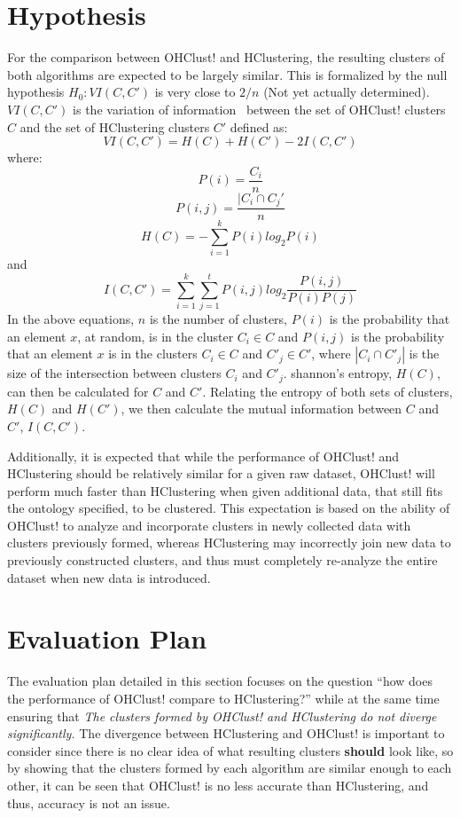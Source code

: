 \documentclass[12pt]{ucthesis}
\begin{document}
   \section{Hypothesis}\label{sec:eval_goals}
      For the comparison between \textsf{OHClust!} and HClustering, the resulting
      clusters of both algorithms are expected to be largely similar. This is
      formalized by the null hypothesis $H_0: VI(C, C')$ is very close to $2/n$
      (Not yet actually determined). $VI(C, C')$ is the variation of
      information~\cite{Halkidi:Validation} between the set of \textsf{OHClust!}
      clusters $C$ and the set of HClustering clusters $C'$ defined as:
      $$VI(C, C') = H(C) + H(C') - 2I(C, C')$$
      where:
      $$P(i) = \frac{C_i}{n}$$
      $$P(i,j) = \frac{| C_i \cap C_j'}{n}$$
      $$H(C) = -\sum_{i=1}^{k}P(i)log_2P(i)$$
      and
      $$I(C, C') = \sum_{i=1}^{k}\sum_{j=1}^{t}P(i,j)log_2\frac{P(i,j)}{P(i)P(j)}$$
      In the above equations, $n$ is the number of clusters, $P(i)$ is the
      probability that an element $x$, at random, is in the cluster $C_i \in C$
      and $P(i, j)$ is the probability that an element $x$ is in the clusters
      $C_i \in C$ and $C'_j \in C'$, where $|C_i \cap C'_j|$ is the size of the
      intersection between clusters $C_i$ and $C'_j$. shannon's entropy,
      $H(C)$, can then be calculated for $C$ and $C'$. Relating the entropy of
      both sets of clusters, $H(C)$ and $H(C')$, we then calculate the mutual
      information between $C$ and $C'$, $I(C, C')$.

      Additionally, it is expected that while the performance of \textsf{OHClust!} and
      HClustering should be relatively similar for a given raw dataset,
      \textsf{OHClust!} will perform much faster than HClustering when given additional
      data, that still fits the ontology specified, to be clustered. This
      expectation is based on the ability of \textsf{OHClust!} to analyze and
      incorporate clusters in newly collected data with clusters previously
      formed, whereas HClustering may incorrectly join new data to previously
      constructed clusters, and thus must completely re-analyze the entire
      dataset when new data is introduced.

   \section{Evaluation Plan}\label{sec:eval_plan}
      The evaluation plan detailed in this section focuses on the question
      ``how does the performance of \textsf{OHClust!} compare to HClustering?'' while at
      the same time ensuring that \textit{The clusters formed by OHClust! and
      HClustering do not diverge significantly.} The divergence between
      HClustering and \textsf{OHClust!} is important to consider since there is no clear idea
      of what resulting clusters \textbf{should} look like, so by showing that
      the clusters formed by each algorithm are similar enough to each other,
      it can be seen that \textsf{OHClust!} is no less accurate than HClustering, and
      thus, accuracy is not an issue.
\end{document}
